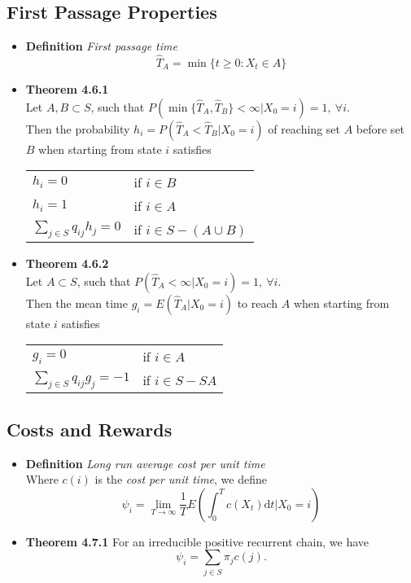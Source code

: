 \documentclass[11pt,a4paper]{article}
\begin{document}
\subsection{First Passage Properties}
\begin{itemize}
    \item \textbf{Definition} \emph{First passage time} \\
        \[
            \widehat{T}_A = \min \{t \geq 0 : X_t \in A \}
        \]
    \item \textbf{Theorem 4.6.1} \\
        Let $A, B \subset S$, such that
        $P(\min \{\widehat{T}_A, \widehat{T}_B\} < \infty | X_0 = i) = 1, \ \forall i$. \\
        Then the probability $h_i = P(\widehat{T}_A < \widehat{T}_B | X_0 = i)$
        of reaching set $A$ before set $B$ when starting from state $i$ satisfies
        \begin{center}{}
            \begin{tabular}{l l}
                $h_i = 0$                       & if $i \in B$ \\
                $h_i = 1$                       & if $i \in A$ \\
                $\sum_{j \in S} q_{ij} h_j = 0$ & if $i \in S - (A \cup B)$
            \end{tabular}
        \end{center}
    \item \textbf{Theorem 4.6.2} \\
        Let $A \subset S$, such that $P(\widehat{T}_A < \infty | X_0 = i) = 1, \ \forall i$. \\
        Then the mean time $g_i = E(\widehat{T}_A | X_0 = i)$ to reach $A$ when starting from state
        $i$ satisfies

        \begin{center}{}
            \begin{tabular}{l l}
                $g_i = 0$                        & if $i \in A$ \\
                $\sum_{j \in S} q_{ij} g_j = -1$ & if $i \in S -S A$
            \end{tabular}
        \end{center}
\end{itemize}

\subsection{Costs and Rewards}

\begin{itemize}
    \item \textbf{Definition} \emph{Long run average cost per unit time} \\
        Where $c(i)$ is the \emph{cost per unit time}, we define
        \[
            \psi_i = \lim_{T \to \infty} \frac{1}{T} E
            \left(\int_0^T c(X_t) \mathrm{d}t | X_0 = i\right)
        \]
    \item \textbf{Theorem 4.7.1}
        For an irreducible positive recurrent chain, we have
        \[
            \psi_i = \sum_{j \in S} \pi_j c(j).
        \]
\end{itemize}
\end{document}
